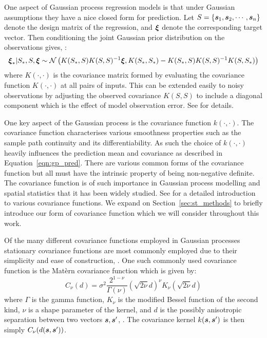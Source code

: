 One aspect of Gaussian process regression models is that under Gaussian assumptions they have a nice closed form for prediction. Let $S = \{ \bm{{s}}_{1}, \bm{{s}}_{2}, \cdots, \bm{{s}}_{n}\}$ denote the design matrix of the regression, and $\bm{{\xi}}$ denote the corresponding target vector. Then conditioning the joint Gaussian prior distribution on the observations gives, \citep{williams_gaussian_2006}:
\begin{equation}\label{eqn:gp_pred}
	\bm{{\xi}}_{*} | S_{*}, S, \bm{{\xi}} \sim \mathcal{N}\left(K(S_*, S)K(S, S)^{-1} \bm{{\xi}}, K(S_*, S_*) - K(S_*, S)K(S, S)^{-1}K(S, S_*)\right)
\end{equation}
where $K(\cdot, \cdot)$ is the covariance matrix formed by evaluating the covariance function $K(\cdot, \cdot)$ at all pairs of inputs. This can be extended easily to noisy observations by adjusting the observed covariance $K(S, S)$ to include a diagonal component which is the effect of model observation error. See \citep{williams_gaussian_2006} for details. 


One key aspect of the Gaussian process is the covariance function $k(\cdot, \cdot)$.
The covariance function characterises various smoothness properties such as the sample path continuity and its differentiability.
As such the choice of $k(\cdot, \cdot)$ heavily influences the prediction mean and covariance as described in Equation~\eqref{eqn:gp_pred}.
There are various common forms of the covariance function but all must have the intrinsic property of being non-negative definite.
The covariance function is of such importance in Gaussian process modelling and spatial statistics that it has been widely studied.
See \citep[Chapter~4]{williams_gaussian_2006} for a detailed introduction to various covariance functions. We expand on Section~\ref{sec:st_methods} to briefly introduce our form of covariance function which we will consider throughout this work. 

Of the many different covariance functions employed in Gaussian processes stationary covariance functions are most commonly employed due to their simplicity and ease of construction, \citep{cressie_statistics_2010}.
One such commonly used covariance function is the Mat\`{e}rn covariance function which is given by: 
\begin{equation}\label{eqn:mat}
	C_\nu(d) = \sigma^2 \frac{2^{1-\nu}}{\Gamma(\nu)} \left(\sqrt{2\nu}d\right)^\nu K_\nu \left( \sqrt{2\nu}d \right) 
\end{equation}
where $\Gamma$ is the gamma function, $K_\nu$ is the modified Bessel function of the second kind, $\nu$ is a shape parameter of the kernel, and $d$ is the possibly anisotropic separation between two vectors $\bm{{s}}, \bm{{s}}^{\prime}$, \citep{abramowitz_handbook_2013}. 
The covariance kernel $k(\bm{{s}}, \bm{{s}}^{\prime})$ is then simply $C_\nu(d(\bm{{s}}, \bm{{s}}^{\prime}))$. 

